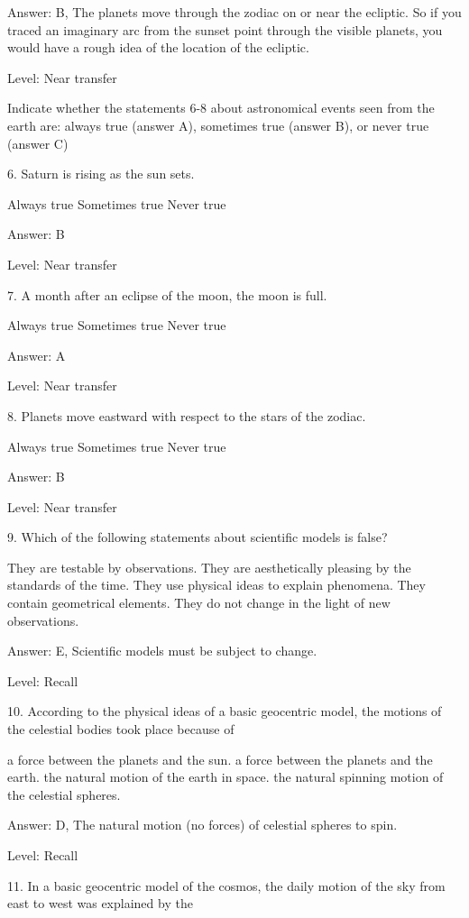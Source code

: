 Answer: B, The planets move through the zodiac on or near the ecliptic. So if you traced an imaginary arc from the sunset point through the visible planets, you would have a rough idea of the location of the ecliptic.

Level: Near transfer

Indicate whether the statements 6-8 about astronomical events seen from the earth are: always true (answer A), sometimes true (answer B), or never true (answer C)

6. Saturn is rising as the sun sets.

    Always true
    Sometimes true
    Never true 

Answer: B

Level: Near transfer

7. A month after an eclipse of the moon, the moon is full.

    Always true
    Sometimes true
    Never true 

Answer: A

Level: Near transfer

8. Planets move eastward with respect to the stars of the zodiac.

    Always true
    Sometimes true
    Never true 

Answer: B

Level: Near transfer

9. Which of the following statements about scientific models is false?

    They are testable by observations.
    They are aesthetically pleasing by the standards of the time.
    They use physical ideas to explain phenomena.
    They contain geometrical elements.
    They do not change in the light of new observations. 

Answer: E, Scientific models must be subject to change.

Level: Recall

10. According to the physical ideas of a basic geocentric model, the motions of the celestial bodies took place because of

    a force between the planets and the sun.
    a force between the planets and the earth.
    the natural motion of the earth in space.
    the natural spinning motion of the celestial spheres. 

Answer: D, The natural motion (no forces) of celestial spheres to spin.

Level: Recall

11. In a basic geocentric model of the cosmos, the daily motion of the sky from east to west was explained by the

